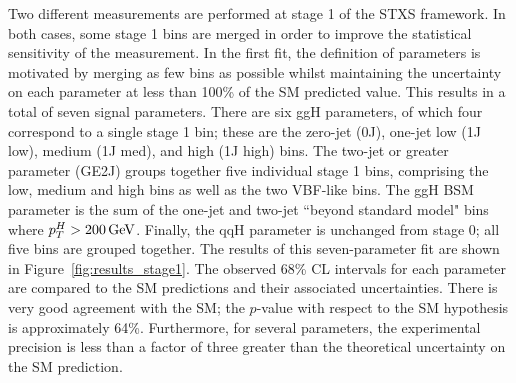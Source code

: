 Two different measurements are performed at stage 1 of the STXS framework.
In both cases, some stage 1 bins are merged 
in order to improve the statistical sensitivity of the measurement.
In the first fit, the definition of parameters is motivated by merging as few bins as possible
whilst maintaining the uncertainty on each parameter at less than 100\% of the SM predicted value.
This results in a total of seven signal parameters.
There are six ggH parameters, of which four correspond to a single stage 1 bin;
these are the zero-jet (0J), one-jet low (1J low), medium (1J med), and high (1J high) \ptH bins.
The two-jet or greater parameter (GE2J) groups together five individual stage 1 bins, 
comprising the low, medium and high \ptH bins as well as the two VBF-like bins.
The ggH BSM parameter is the sum of the one-jet and two-jet ``beyond standard model" bins
where $p_T^H > \SI{200}{GeV}$.
Finally, the qqH parameter is unchanged from stage 0;
all five bins are grouped together.
The results of this seven-parameter fit are shown in Figure~\ref{fig:results_stage1}. 
The observed 68\% CL intervals for each parameter are compared 
to the SM predictions and their associated uncertainties.
There is very good agreement with the SM; 
the $p$-value with respect to the SM hypothesis is approximately 64\%. %
Furthermore, for several parameters, the experimental precision is less than a factor of three 
greater than the theoretical uncertainty on the SM prediction. %


